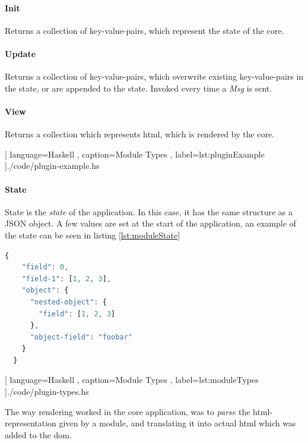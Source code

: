 \paragraph{Init} Returns a collection of key-value-pairs, which represent
the state of the core.

\paragraph{Update} Returns a collection of key-value-pairs, which
overwrite existing key-value-pairs in the state, or are appended to the state.
Invoked every time a \textit{Msg} is sent.

\paragraph{View} Returns a collection which represents \gls{html},
which is rendered by the core.

\begin{center}
  
    [ language=Haskell
    , caption={Module Types}
    , label=lst:pluginExample
    ]{./code/plugin-example.hs}
\end{center}

\paragraph{State}
State is the \textit{state} of the application. In this case, it has the same
structure as a JSON object. A few values are set at the start of the
application, an example of the state can be seen in listing
\ref{lst:moduleState}

\begin{lstlisting}[language=JavaScript, caption={State Example}, label=lst:moduleState]
  {
    "field": 0,
    "field-1": [1, 2, 3],
    "object": {
      "nested-object": {
        "field": [1, 2, 3]
      },
      "object-field": "foobar"
    }
  }
\end{lstlisting}

\begin{center}
  
    [ language=Haskell
    , caption={Module Types}
    , label=lst:moduleTypes
    ]{./code/plugin-types.hs}
\end{center}

The way rendering worked in the core application, was to \textit{parse} the
\gls{html}-representation given by a module, and translating it into actual
\gls{html} which was added to the \gls{dom}.

